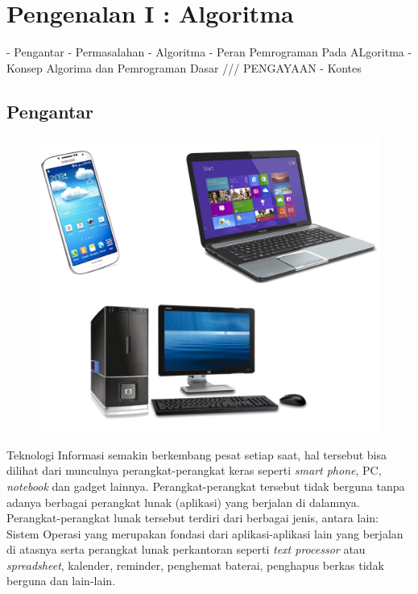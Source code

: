 \chapter{Pengenalan I : Algoritma}\label{ch:pengantarAlgoritma}

%
- Pengantar
- Permasalahan
- Algoritma
- Peran Pemrograman Pada ALgoritma
- Konsep Algorima dan Pemrograman Dasar
/// PENGAYAAN
- Kontes
%

\section{Pengantar}

\begin{figure}
\centering
\includegraphics[scale=0.3]{fig/1/Gambar1.png}	
\end{figure}

Teknologi Informasi semakin berkembang pesat setiap saat, hal tersebut bisa dilihat dari munculnya perangkat-perangkat keras seperti \textit{smart phone}, PC, \textit{notebook} dan gadget lainnya. Perangkat-perangkat tersebut tidak berguna tanpa adanya berbagai perangkat lunak (aplikasi) yang berjalan di dalamnya. Perangkat-perangkat lunak tersebut terdiri dari berbagai jenis, antara lain: Sistem Operasi yang merupakan fondasi dari aplikasi-aplikasi lain yang berjalan di atasnya serta perangkat lunak perkantoran seperti \textit{text processor} atau \textit{spreadsheet}, kalender, reminder, penghemat baterai, penghapus berkas tidak berguna dan lain-lain. 
 
